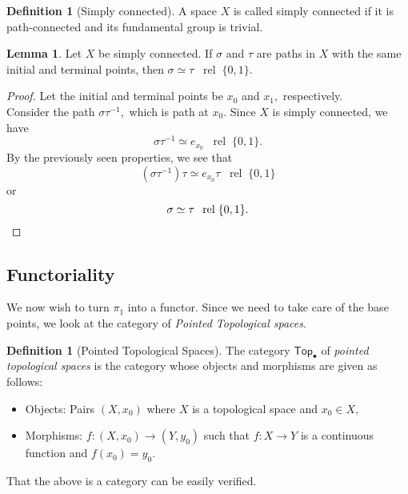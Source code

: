 \documentclass[12pt]{article}
\theoremstyle{definition}
\numberwithin{thm}{section}
\newtheorem{lem}[thm]{Lemma}
\newtheorem{defn}[thm]{Definition}
\newcommand{\rel}{\;\;\operatorname{rel}\;}
\begin{document}
\begin{defn}[Simply connected]
	A space $X$ is called simply connected if it is path-connected and its fundamental group is trivial.
\end{defn}
\begin{lem} \label{lem:simpconnpathshomot}
	Let $X$ be simply connected. If $\sigma$ and $\tau$ are paths in $X$ with the same initial and terminal points, then $\sigma \simeq \tau \rel \{0, 1\}.$
\end{lem}
\begin{proof} 
	Let the initial and terminal points be $x_0$ and $x_1,$ respectively.\\
	Consider the path $\sigma\tau^{-1},$ which is path at $x_0.$ Since $X$ is simply connected, we have
	\begin{equation*} 
		\sigma\tau^{-1} \simeq e_{x_0} \rel \{0, 1\}.
	\end{equation*}
	By the previously seen properties, we see that
	\begin{equation*} 
		(\sigma\tau^{-1})\tau \simeq e_{x_0}\tau \rel \{0, 1\}
	\end{equation*}
	or
	\begin{equation*} 
		\sigma \simeq \tau \rel \{0, 1\}. \qedhere
	\end{equation*}
\end{proof}
\subsection{Functoriality}
We now wish to turn $\pi_1$ into a functor. Since we need to take care of the base points, we look at the category of \emph{Pointed Topological spaces}.
\begin{defn}[Pointed Topological Spaces]
	The category $\mathsf{Top}_\bullet$ of \emph{pointed topological spaces} is the category whose objects and morphisms are given as follows:
	\begin{itemize}
		\item Objects: Pairs $(X, x_0)$ where $X$ is a topological space and $x_0 \in X,$
		\item Morphisms: $f:(X, x_0) \to (Y, y_0)$ such that $f:X\to Y$ is a continuous function and $f(x_0) = y_0.$
	\end{itemize}
\end{defn}
That the above is a category can be easily verified.
\end{document}
